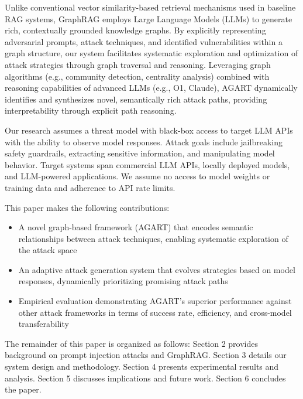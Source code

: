 Unlike conventional vector similarity-based retrieval mechanisms used in baseline RAG systems, GraphRAG employs Large Language Models (LLMs) to generate rich, contextually grounded knowledge graphs. By explicitly representing adversarial prompts, attack techniques, and identified vulnerabilities within a graph structure, our system facilitates systematic exploration and optimization of attack strategies through graph traversal and reasoning. Leveraging graph algorithms (e.g., community detection, centrality analysis) combined with reasoning capabilities of advanced LLMs (e.g., O1, Claude), AGART dynamically identifies and synthesizes novel, semantically rich attack paths, providing interpretability through explicit path reasoning.

Our research assumes a threat model with black-box access to target LLM APIs with the ability to observe model responses. Attack goals include jailbreaking safety guardrails, extracting sensitive information, and manipulating model behavior. Target systems span commercial LLM APIs, locally deployed models, and LLM-powered applications. We assume no access to model weights or training data and adherence to API rate limits.

This paper makes the following contributions:
\begin{itemize}
\item A novel graph-based framework (AGART) that encodes semantic relationships between attack techniques, enabling systematic exploration of the attack space
\item An adaptive attack generation system that evolves strategies based on model responses, dynamically prioritizing promising attack paths
\item Empirical evaluation demonstrating AGART's superior performance against other attack frameworks in terms of success rate, efficiency, and cross-model transferability
\end{itemize}

The remainder of this paper is organized as follows: Section 2 provides background on prompt injection attacks and GraphRAG. Section 3 details our system design and methodology. Section 4 presents experimental results and analysis. Section 5 discusses implications and future work. Section 6 concludes the paper. 